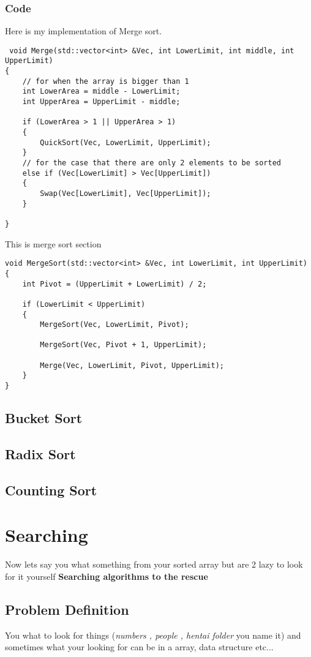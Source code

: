 \documentclass{article}
\begin{document}
\subsubsection{Code }
Here is my implementation of Merge sort.
 \begin{lstlisting} 
 void Merge(std::vector<int> &Vec, int LowerLimit, int middle, int UpperLimit)
{
	// for when the array is bigger than 1
	int LowerArea = middle - LowerLimit;
	int UpperArea = UpperLimit - middle;

	if (LowerArea > 1 || UpperArea > 1)
	{
		QuickSort(Vec, LowerLimit, UpperLimit);
	}
	// for the case that there are only 2 elements to be sorted 
	else if (Vec[LowerLimit] > Vec[UpperLimit])
	{
		Swap(Vec[LowerLimit], Vec[UpperLimit]);
	}

}
\end{lstlisting} 
 This is merge sort section
\begin{lstlisting} 
void MergeSort(std::vector<int> &Vec, int LowerLimit, int UpperLimit)
{
	int Pivot = (UpperLimit + LowerLimit) / 2;

	if (LowerLimit < UpperLimit)
	{
		MergeSort(Vec, LowerLimit, Pivot);

		MergeSort(Vec, Pivot + 1, UpperLimit);

		Merge(Vec, LowerLimit, Pivot, UpperLimit);
	}
}
\end{lstlisting} 
\subsection{Bucket Sort}

\subsection{Radix Sort} 
\subsection{Counting Sort}

 \section{Searching}
Now lets say you what something from your sorted array but are 2 lazy to look for it yourself \textbf{Searching algorithms to the rescue} 
\subsection{Problem Definition}\label{subsec:Problem Searching}
You what to look for things (\textit{numbers , people , hentai folder} you name it) and sometimes what your looking for can be in a array, data structure etc... 
\end{document}
